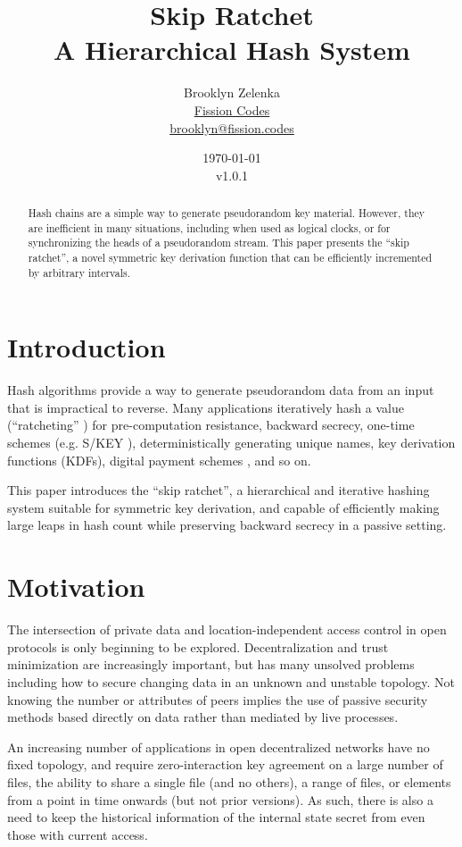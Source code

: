 \documentclass[twocolumn]{article}
\title{Skip Ratchet \\[1ex] \large A Hierarchical Hash System}
\author{Brooklyn Zelenka \\ \href{https://fission.codes}{Fission Codes} \\ \href{mailto:brooklyn@fission.codes}{brooklyn@fission.codes} }
\date{\today\\v1.0.1}
\begin{document}
    \maketitle
    
   	\begin{abstract}
  		Hash chains are a simple way to generate pseudorandom key material. However, they are inefficient in many situations, including when used as logical clocks, or for synchronizing the heads of a pseudorandom stream. This paper presents the ``skip ratchet'', a novel symmetric key derivation function that can be efficiently incremented by arbitrary intervals.
   	\end{abstract}

   	\section{Introduction}
   	
	Hash algorithms provide a way to generate pseudorandom data from an input that is impractical to reverse. Many applications iteratively hash a value (``ratcheting'' \cite{pond}) for pre-computation resistance, backward secrecy, one-time schemes (e.g. S/KEY \cite{rfc1760}), deterministically generating unique names, key derivation functions (KDFs), digital payment schemes \cite{multidimensional}, and so on.
	
	This paper introduces the ``skip ratchet'', a hierarchical and iterative hashing system suitable for symmetric key derivation, and capable of efficiently making large leaps in hash count while preserving backward secrecy in a passive setting.

    \section{Motivation}
    
    The intersection of private data and location-independent access control in open protocols is only beginning to be explored. Decentralization and trust minimization are increasingly important, but has many unsolved problems including how to secure changing data in an unknown and unstable topology. Not knowing the number or attributes of peers implies the use of passive security methods based directly on data rather than mediated by live processes.
    
    An increasing number of applications in open decentralized networks have no fixed topology, and require zero-interaction key agreement on a large number of files, the ability to share a single file (and no others), a range of files, or elements from a point in time onwards (but not prior versions). As such, there is also a need to keep the historical information of the internal state secret from even those with current access.
    
\end{document}

